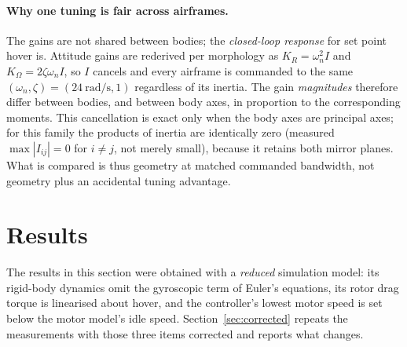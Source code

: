 \documentclass[11pt,a4paper]{article}
\begin{document}
\paragraph{Why one tuning is fair across airframes.} The gains are not shared between bodies; the \emph{closed-loop response} for set point hover is. Attitude gains are rederived per morphology as $K_R=\omega_n^2 I$ and $K_\Omega=2\zeta\omega_n I$, so $I$ cancels and every airframe is commanded to the same $(\omega_n,\zeta)=(\SI{24}{\radian\per\second},1)$ regardless of its inertia. The gain \emph{magnitudes} therefore differ between bodies, and between body axes, in proportion to the corresponding moments. This cancellation is exact only when the body axes are principal axes; for this family the products of inertia are identically zero (measured $\max|I_{ij}|=0$ for $i\neq j$, not merely small), because it retains both mirror planes. What is compared is thus geometry at matched commanded bandwidth, not geometry plus an accidental tuning advantage.



\section{Results}
\label{sec:results}

The results in this section were obtained with a \emph{reduced} simulation
model: its rigid-body dynamics omit the gyroscopic term of Euler's equations, its
rotor drag torque is linearised about hover, and the controller's lowest motor
speed is set below the motor model's idle speed.
Section~\ref{sec:corrected} repeats the measurements with those three items
corrected and reports what changes.

\begin{table}[htb]
  \centering
  \caption{Maximum completing speed (\si{\metre\per\second}) by arm half-angle
  and corner sharpness, reduced model. Bold marks the best in each column. Roll
  authority $\alpha_\phi$ is in \si{\radian\per\second\squared} per newton.}
  \label{tab:results}
  
\end{table}
\end{document}
